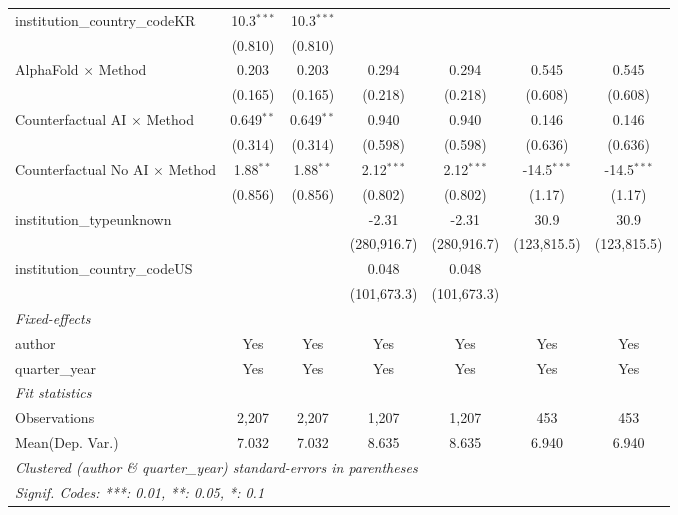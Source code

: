\begin{tabular}{lcccccc}
   institution\_country\_codeKR          & 10.3$^{***}$   & 10.3$^{***}$   &               &               &               &   \\   
                                         & (0.810)        & (0.810)        &               &               &               &   \\   
   AlphaFold $\times$ Method             & 0.203          & 0.203          & 0.294         & 0.294         & 0.545         & 0.545\\   
                                         & (0.165)        & (0.165)        & (0.218)       & (0.218)       & (0.608)       & (0.608)\\   
   Counterfactual AI $\times$ Method     & 0.649$^{**}$   & 0.649$^{**}$   & 0.940         & 0.940         & 0.146         & 0.146\\   
                                         & (0.314)        & (0.314)        & (0.598)       & (0.598)       & (0.636)       & (0.636)\\   
   Counterfactual No AI $\times$ Method  & 1.88$^{**}$    & 1.88$^{**}$    & 2.12$^{***}$  & 2.12$^{***}$  & -14.5$^{***}$ & -14.5$^{***}$\\   
                                         & (0.856)        & (0.856)        & (0.802)       & (0.802)       & (1.17)        & (1.17)\\   
   institution\_typeunknown              &                &                & -2.31         & -2.31         & 30.9          & 30.9\\   
                                         &                &                & (280,916.7)   & (280,916.7)   & (123,815.5)   & (123,815.5)\\   
   institution\_country\_codeUS          &                &                & 0.048         & 0.048         &               &   \\   
                                         &                &                & (101,673.3)   & (101,673.3)   &               &   \\   
   \midrule
   \emph{Fixed-effects}\\
   author                                & Yes            & Yes            & Yes           & Yes           & Yes           & Yes\\  
   quarter\_year                         & Yes            & Yes            & Yes           & Yes           & Yes           & Yes\\  
   \midrule
   \emph{Fit statistics}\\
   Observations                          & 2,207          & 2,207          & 1,207         & 1,207         & 453           & 453\\  
Mean(Dep. Var.) & 7.032 & 7.032 & 8.635 & 8.635 & 6.940 & 6.940 \\
   \midrule \midrule
   \multicolumn{7}{l}{\emph{Clustered (author \& quarter\_year) standard-errors in parentheses}}\\
   \multicolumn{7}{l}{\emph{Signif. Codes: ***: 0.01, **: 0.05, *: 0.1}}\\
\end{tabular}
\par\endgroup
